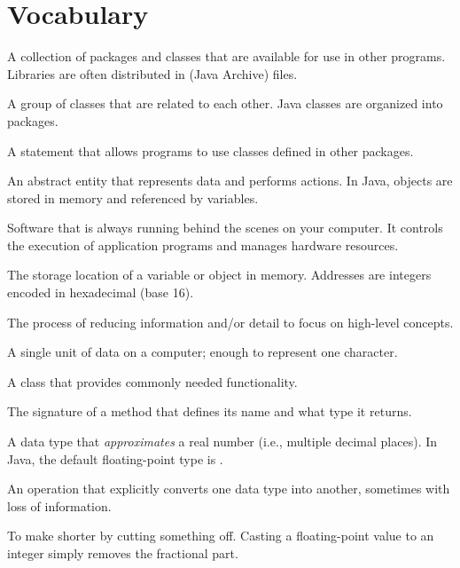 \section{Vocabulary}

\begin{description}

A collection of packages and classes that are available for use in other programs.
Libraries are often distributed in  (Java Archive) files.

A group of classes that are related to each other.
Java classes are organized into packages.

A statement that allows programs to use classes defined in other packages.

An abstract entity that represents data and performs actions.
In Java, objects are stored in memory and referenced by variables.

Software that is always running behind the scenes on your computer.
It controls the execution of application programs and manages hardware resources.

The storage location of a variable or object in memory.
Addresses are integers encoded in hexadecimal (base 16).

The process of reducing information and/or detail to focus on high-level concepts.

A single unit of data on a computer; enough to represent one character.

A class that provides commonly needed functionality.

The signature of a method that defines its name and what type it returns.

A data type that {\em approximates} a real number (i.e., multiple decimal places).
In Java, the default floating-point type is .

An operation that explicitly converts one data type into another, sometimes with loss of information.

To make shorter by cutting something off.
Casting a floating-point value to an integer simply removes the fractional part.

\end{description}
